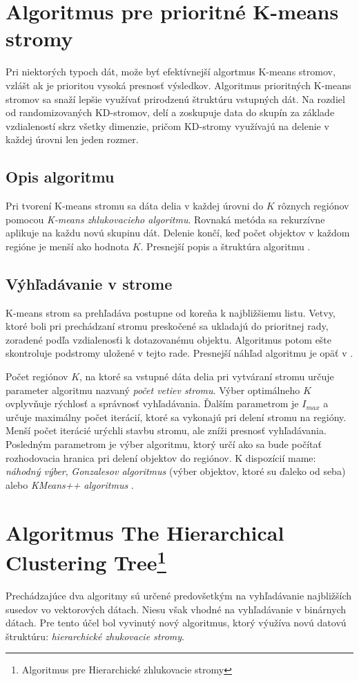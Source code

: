 \documentclass[12pt,oneside]{fithesis2}
\begin{document}
	\section{Algoritmus pre prioritné K-means stromy}
	Pri niektorých typoch dát, može byť efektívnejší algortmus K-means stromov, vzlášt ak je prioritou vysoká presnosť výsledkov. Algoritmus prioritných K-means stromov sa snaží lepšie využívať prirodzenú štruktúru vstupných dát. Na rozdiel od randomizovaných KD-stromov, delí a zoskupuje data do skupín za základe vzdialeností skrz všetky dimenzie, pričom KD-stromy využívajú na delenie v každej úrovni len jeden rozmer. \cite{flann_pami_2014}
	\subsection{Opis algoritmu}
	Pri tvorení K-means stromu sa dáta delia v každej úrovni do $K$ rôznych regiónov pomocou \textit{K-means zhlukovacieho algoritmu}. Rovnaká metóda sa rekurzívne aplikuje na každu novú skupinu dát. Delenie končí, keď počet objektov v každom regióne je menší ako hodnota $K$. Presnejší popis a štruktúra algoritmu \cite{flann_pami_2014}.
	\subsection{Výhľadávanie v strome}
	K-means strom sa prehľadáva postupne od koreňa k najbližšiemu listu. Vetvy, ktoré boli pri prechádzaní stromu preskočené sa ukladajú do prioritnej rady, zoradené podľa vzdialenosťi k dotazovanému objektu. Algoritmus potom ešte skontroluje podstromy uložené v tejto rade. Presnejší náhľad algoritmu je opäť v \cite{flann_pami_2014}.
	
	Počet regiónov $K$, na ktoré sa vstupné dáta delia pri vytváraní stromu určuje parameter algoritmu nazvaný \textit{počet vetiev stromu}. Výber optimálneho $K$ ovplyvňuje rýchlosť a správnosť vyhľadávania. Ďalším parametrom je $I_{max}$ a určuje maximálny počet iterácií, ktoré sa vykonajú pri delení stromu na regióny. Menší počet iterácié urýchli stavbu stromu, ale zníži presnosť vyhľadávania. Posledným parametrom je výber algoritmu, ktorý určí ako sa bude počítať rozhodovacia hranica pri delení objektov do regiónov. K dispozícií mame: \textit{náhodný výber}, \textit{Gonzalesov algoritmus} (výber objektov, ktoré su ďaleko od seba) alebo  \textit{KMeans++ algoritmus} \cite{K-means++}. \cite{flann_pami_2014}
	
	\section{Algoritmus The Hierarchical Clustering Tree\protect\footnote{Algoritmus pre Hierarchické zhlukovacie stromy}}
	Prechádzajúce dva algoritmy sú určené predovšetkým na vyhľadávanie najbližších susedov vo vektorových dátach. Niesu však vhodné na vyhľadávanie v binárnych dátach. Pre tento účel bol vyvinutý nový algoritmus, ktorý výužíva novú datovú štruktúru: \textit{hierarchické zhukovacie stromy}. \cite{Attach:binary_matching_crv2012}
	
\end{document}

